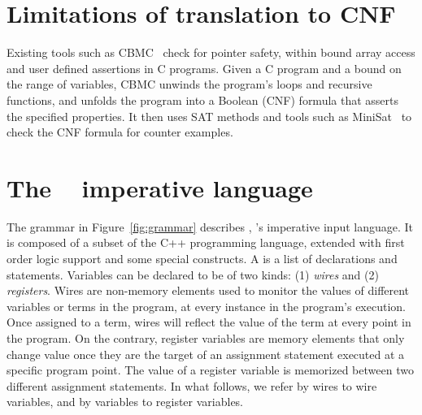 \section{Limitations of translation to CNF}
\label{s:intro:limitations}
Existing tools such as CBMC~\cite{clarke2004tool}
check for pointer safety, within bound
array access and user defined assertions in C programs.
Given a C program and a bound on the range of variables, CBMC unwinds the program's 
loops and recursive functions, and unfolds the program 
into a Boolean (CNF) formula that asserts the specified properties. 
It then uses SAT methods and tools such as MiniSat~\cite{sorensson2005minisat}
to check the CNF formula for counter examples. 





\section{The \psqlanguage~ imperative language} \label{chap:c2aig:sec:formalization}
The grammar in Figure~\ref{fig:grammar} describes \psqlanguage, \mytool's
imperative input language. It is composed of a subset of the C++
programming language, extended with first order logic support 
and some special constructs. A  is a list of 
declarations and statements. Variables can be declared to be of two 
kinds: (1) {\em wires} and (2) {\em registers}. Wires are non-memory 
elements used to monitor the values of different variables or terms
in the program, at every instance in the program's execution. Once assigned
to a term, wires will reflect the value of the term at 
every point in the program. On the contrary, register variables 
are memory elements that only change value once they are the target
of an assignment statement executed at a specific program point. 
The value of a register variable is memorized between two different
assignment statements. In what follows, we refer by wires to 
wire variables, and by variables to register variables. 

